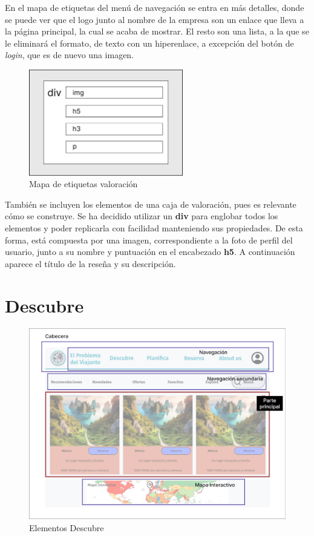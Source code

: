 \documentclass[11pt, a4paper]{book}
\begin{document}
	En el mapa de etiquetas del menú de navegación se entra en más detalles, donde se puede ver que el logo junto al nombre de la empresa son un enlace que lleva a la página principal, la cual se acaba de mostrar. El resto son una lista, a la que se le eliminará el formato, de texto con un hiperenlace, a excepción del botón de \textit{login}, que es de nuevo una imagen.
	
	\begin{figure} [H]
		\centering
		\includegraphics[width=0.6\textwidth]{HTML/Etiq-valoracion.jpg}
		\caption{Mapa de etiquetas valoración}
	\end{figure}

	También se incluyen los elementos de una caja de valoración, pues es relevante cómo se construye. Se ha decidido utilizar un \textbf{div} para englobar todos los elementos y poder replicarla con facilidad manteniendo sus propiedades. De esta forma, está compuesta por una imagen, correspondiente a la foto de perfil del usuario, junto a su nombre y puntuación en el encabezado \textbf{h5}. A continuación aparece el título de la reseña y su descripción.

    \section{Descubre}

	\begin{figure} [H]
		\centering
		\includegraphics[width=\textwidth]{HTML/Doc-descubre.jpg}
		\caption{Elementos Descubre}
	\end{figure}
\end{document}

